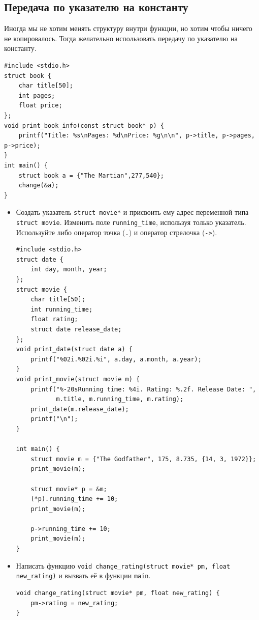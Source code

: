 \documentclass{article}
\begin{document}
\subsection*{Передача по указателю на константу}
Иногда мы не хотим менять структуру внутри функции, но хотим чтобы ничего не копировалось. Тогда желательно использовать передачу по указателю
на константу.
\begin{lstlisting}
#include <stdio.h>
struct book {
    char title[50];
    int pages;
    float price;
};
void print_book_info(const struct book* p) {
    printf("Title: %s\nPages: %d\nPrice: %g\n\n", p->title, p->pages, p->price);
}
int main() {
    struct book a = {"The Martian",277,540};
    change(&a);
}
\end{lstlisting}

\begin{itemize}
\item Создать указатель \texttt{struct movie*} и присвоить ему адрес переменной типа \texttt{struct movie}.  Изменить поле \texttt{running\_time}, используя только указатель.  Используйте либо оператор точка (\texttt{.}) и оператор стрелочка (\texttt{->}).
\begin{lstlisting}[backgroundcolor = \color{solcolor}]
#include <stdio.h>
struct date {
    int day, month, year;
};
struct movie {
    char title[50];
    int running_time;
    float rating;
    struct date release_date;
};
void print_date(struct date a) {
    printf("%02i.%02i.%i", a.day, a.month, a.year);
}
void print_movie(struct movie m) {
    printf("%-20sRunning time: %4i. Rating: %.2f. Release Date: ", 
           m.title, m.running_time, m.rating);
    print_date(m.release_date);
    printf("\n");
}

int main() {
    struct movie m = {"The Godfather", 175, 8.735, {14, 3, 1972}};
    print_movie(m);
    
    struct movie* p = &m;
    (*p).running_time += 10;
    print_movie(m); 
    
    p->running_time += 10;
    print_movie(m); 
}
\end{lstlisting}

\item Написать функцию \texttt{void change\_rating(struct movie* pm, float new\_rating)} и вызвать её в функции \texttt{main}.
\begin{lstlisting}[backgroundcolor = \color{solcolor}]
void change_rating(struct movie* pm, float new_rating) {
    pm->rating = new_rating;
}
\end{lstlisting}


\end{itemize}
\end{document}
